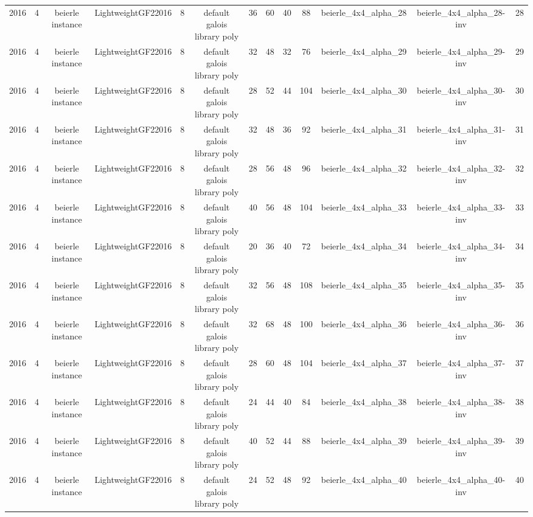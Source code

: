 \begin{tabular}{c c c c c c c c c c c c c}
2016 & 4 & beierle instance & LightweightGF22016 & 8 & default galois library poly & 36 & 60 & 40 & 88 & beierle_4x4_alpha_28 & beierle_4x4_alpha_28-inv & 28 \\
2016 & 4 & beierle instance & LightweightGF22016 & 8 & default galois library poly & 32 & 48 & 32 & 76 & beierle_4x4_alpha_29 & beierle_4x4_alpha_29-inv & 29 \\
2016 & 4 & beierle instance & LightweightGF22016 & 8 & default galois library poly & 28 & 52 & 44 & 104 & beierle_4x4_alpha_30 & beierle_4x4_alpha_30-inv & 30 \\
2016 & 4 & beierle instance & LightweightGF22016 & 8 & default galois library poly & 32 & 48 & 36 & 92 & beierle_4x4_alpha_31 & beierle_4x4_alpha_31-inv & 31 \\
2016 & 4 & beierle instance & LightweightGF22016 & 8 & default galois library poly & 28 & 56 & 48 & 96 & beierle_4x4_alpha_32 & beierle_4x4_alpha_32-inv & 32 \\
2016 & 4 & beierle instance & LightweightGF22016 & 8 & default galois library poly & 40 & 56 & 48 & 104 & beierle_4x4_alpha_33 & beierle_4x4_alpha_33-inv & 33 \\
2016 & 4 & beierle instance & LightweightGF22016 & 8 & default galois library poly & 20 & 36 & 40 & 72 & beierle_4x4_alpha_34 & beierle_4x4_alpha_34-inv & 34 \\
2016 & 4 & beierle instance & LightweightGF22016 & 8 & default galois library poly & 32 & 56 & 48 & 108 & beierle_4x4_alpha_35 & beierle_4x4_alpha_35-inv & 35 \\
2016 & 4 & beierle instance & LightweightGF22016 & 8 & default galois library poly & 32 & 68 & 48 & 100 & beierle_4x4_alpha_36 & beierle_4x4_alpha_36-inv & 36 \\
2016 & 4 & beierle instance & LightweightGF22016 & 8 & default galois library poly & 28 & 60 & 48 & 104 & beierle_4x4_alpha_37 & beierle_4x4_alpha_37-inv & 37 \\
2016 & 4 & beierle instance & LightweightGF22016 & 8 & default galois library poly & 24 & 44 & 40 & 84 & beierle_4x4_alpha_38 & beierle_4x4_alpha_38-inv & 38 \\
2016 & 4 & beierle instance & LightweightGF22016 & 8 & default galois library poly & 40 & 52 & 44 & 88 & beierle_4x4_alpha_39 & beierle_4x4_alpha_39-inv & 39 \\
2016 & 4 & beierle instance & LightweightGF22016 & 8 & default galois library poly & 24 & 52 & 48 & 92 & beierle_4x4_alpha_40 & beierle_4x4_alpha_40-inv & 40 \\

\end{tabular}
